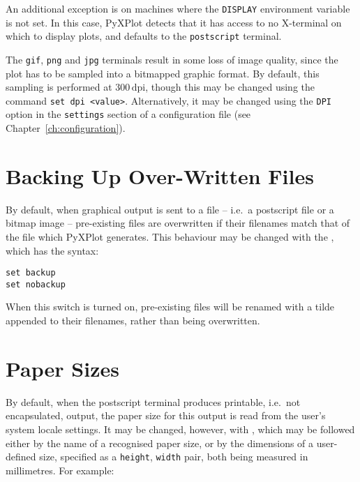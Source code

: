 An additional exception is on machines where the {\tt DISPLAY} environment
variable is not set. In this case, PyXPlot detects that it has access to no
X-terminal on which to display plots, and defaults to the {\tt postscript}
terminal.

The {\tt gif}, {\tt png} and {\tt jpg} terminals result in some loss of image
quality, since the plot has to be sampled into a bitmapped graphic format.  By
default, this sampling is performed at $300\,\mathrm{dpi}$, though this may be
changed using the command {\tt set dpi <value>}. Alternatively, it may be
changed using the {\tt DPI} option in the {\tt settings} section of a
configuration file (see Chapter~\ref{ch:configuration}).

\section{Backing Up Over-Written Files}

\label{sec:file_backup}

By default, when graphical output is sent to a file -- i.e.\ a postscript file or
a bitmap image -- pre-existing files are overwritten if their filenames match
that of the file which PyXPlot generates. This behaviour may be changed with
the , which has the syntax:

\begin{verbatim}
set backup
set nobackup
\end{verbatim}

When this switch is turned on, pre-existing files will be renamed with a tilde
appended to their filenames, rather than being overwritten.

\section{Paper Sizes}
\label{sec:set_papersize}

By default, when the postscript terminal produces printable, i.e.\ not
encapsulated, output, the paper size for this output is read from the user's
system locale settings. It may be changed, however, with , which may be followed either by the name of a recognised paper
size, or by the dimensions of a user-defined size, specified as a {\tt height},
{\tt width} pair, both being measured in millimetres. For example:

